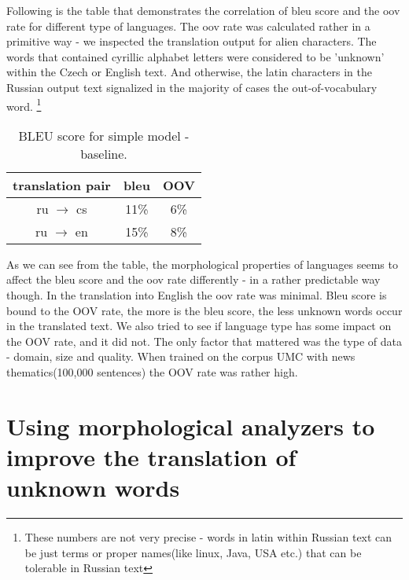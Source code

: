 \documentclass[11pt,letterpaper]{article}
\begin{document}
Following is the table that demonstrates the correlation of bleu score and 
the oov rate for different type of languages. 
The oov rate was calculated 
rather in a primitive way - we inspected the translation output for alien characters. The words that contained
cyrillic alphabet letters were considered to be 'unknown' within the Czech or English text.
And otherwise, the latin characters in the Russian output text signalized in the majority of cases 
the out-of-vocabulary word. \footnote{These numbers are not very precise - words in latin within Russian text
can be just terms or proper names(like linux, Java, USA etc.) that can be tolerable in Russian text }

 
\begin{table*}
\begin{center}
\begin{tabular}{c c c}
\hline
translation pair& bleu & OOV \\
\hline
ru $\rightarrow$ cs & 11\% & 6\% \\%
ru $\rightarrow$  en & 15\% & 8\% \\ %
\hline
\end{tabular}
\end{center}
\caption{BLEU score for simple model - baseline.}
\label{tab:umc_yan}
\end{table*}

As we can see from the table, the morphological properties of languages seems to
affect the bleu score and the oov rate differently - in a rather predictable way though.
In the translation into English the oov rate was minimal. 
Bleu score is bound to the OOV rate, the more is the bleu  score, the less unknown words occur 
in the translated text.
We also tried to see if language type has some impact on the OOV rate, and it did not.
The only factor that mattered was the type of data - domain, size and quality. When 
trained on the corpus UMC with news thematics(100,000 sentences) the OOV rate was rather high.

\section{Using morphological analyzers to improve the translation of unknown words}
\end{document}
